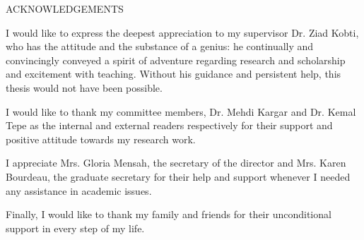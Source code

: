 \newpage
{}

\begin{center}
ACKNOWLEDGEMENTS
\end{center}

I would like to express the deepest appreciation to my supervisor Dr. Ziad Kobti, who has the attitude and the substance of a genius: he continually and convincingly conveyed a spirit of adventure regarding research and scholarship and excitement with teaching. Without his guidance and persistent help, this thesis would not have been possible.
\newline
\par I would like to thank my committee members, Dr. Mehdi Kargar and Dr. Kemal Tepe as the internal and external readers respectively for their support and positive attitude towards my research work.
\newline
\par I appreciate Mrs. Gloria Mensah, the secretary of the director and Mrs. Karen Bourdeau, the graduate secretary for their help and support whenever I needed any assistance in academic issues.
\par Finally, I would like to thank my family and friends for their unconditional support in every step of my life.

%
